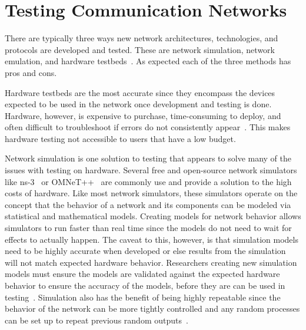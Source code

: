 \section{Testing Communication Networks} %
There are typically three ways new network architectures, technologies, and protocols are developed and tested. These are network simulation, network emulation, and hardware testbeds~\cite{simulation_emulation}.
As expected each of the three methods has pros and cons. \par
Hardware testbeds are the most accurate since they encompass the devices expected to be used in the network once development and testing is done.
Hardware, however, is expensive to purchase, time-consuming to deploy, and often difficult to troubleshoot if errors do not consistently appear~\cite{nsclick}.
This makes hardware testing not accessible to users that have a low budget. \par
Network simulation is one solution to testing that appears to solve many of the issues with testing on hardware.
Several free and open-source network simulators like ns-3~\cite{ns3} or OMNeT++~\cite{omnet++} are commonly use and provide a solution to the high costs of hardware.
Like most network simulators, these simulators operate on the concept that the behavior of a network and its components can be modeled via statistical and mathematical models.
Creating models for network behavior allows simulators to run faster than real time since the models do not need to wait for effects to actually happen.
The caveat to this, however, is that simulation models need to be highly accurate when developed or else results from the simulation will not match expected hardware behavior.
Researchers creating new simulation models must ensure the models are validated against the expected hardware behavior to ensure the accuracy of the models, before they are can be used in testing~\cite{omnet_manager}.
Simulation also has the benefit of being highly repeatable since the behavior of the network can be more tightly controlled and any random processes can be set up to repeat previous random outputs~\cite{simulation_emulation}. \par
